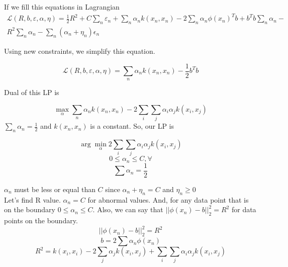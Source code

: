 \documentclass[letter,11pt]{article}
\begin{document}
	If we fill this equations in Lagrangian
	\begin{equation}
		\begin{aligned}
	 \mathcal{L}(R,b,\varepsilon,\alpha,\eta) = \frac{1}{2}R^2 +  C\sum_{n}\varepsilon_n + \sum_{n} \alpha_n k(x_n,x_n) - 2\sum_{n}\alpha_n \phi(x_n)^Tb + b^Tb\sum_{n}\alpha_n - \\ R^2 \sum_{n} \alpha_n - \sum_{n}(\alpha_n + \eta_n)\epsilon_n
		\end{aligned}
	\end{equation}
		
	Using new constraints, we simplify this equation.
	
	\begin{equation}
	\mathcal{L}(R,b,\varepsilon,\alpha,\eta) = \sum_{n} \alpha_n k(x_n,x_n) - \frac{1}{2}b^Tb
	\end{equation}
		
	Dual of this LP is
	
	\begin{equation}
		\max_\alpha \sum_{n} \alpha_n k(x_n,x_n) - 2 \sum_{i}\sum_{j}\alpha_i \alpha_j k(x_i,x_j)
	\end{equation}
	$\sum_{n} \alpha_n = \frac{1}{2}$ and $k(x_n,x_n)$ is a constant. So, our LP is
	
	\begin{equation}
	\arg\min_\alpha 2 \sum_{i}\sum_{j}\alpha_i \alpha_j k(x_i,x_j)
	\end{equation}
	\begin{equation}
	0 \leq \alpha_n \leq C, \forall 
	\end{equation}
	\begin{equation}
	\sum \alpha_n = \frac{1}{2}
	\end{equation}
	
	$\alpha_n$ must be less or equal than $C$ since $\alpha_n + \eta_n = C$ and $\eta_n \geq 0$\\
	
	
	Let's find R value. $\alpha_n = C$ for abnormal values. And, for any data point that is on the boundary $ 0 \leq \alpha_n \leq C$. Also, we can say that $||\phi(x_n) - b||_2^2 = R^2$ for data points on the boundary.
	\begin{equation}
	||\phi(x_n) - b||_2^2 = R^2
	\end{equation}
	\begin{equation}
	b = 2\sum \alpha_n \phi(x_n)
	\end{equation}
	\begin{equation}
	R^2 = k(x_i,x_i) - 2 \sum_{j} \alpha_j k(x_i,x_j) + \sum_{i} \sum_{j} \alpha_i\alpha_j k(x_i,x_j)
	\end{equation}
	
\end{document}
